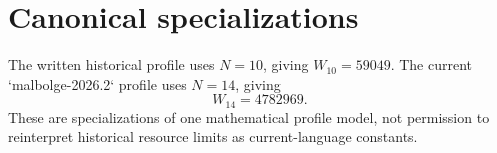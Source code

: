 \documentclass{article}
\begin{document}
\section{Canonical specializations}

The written historical profile uses $N=10$, giving $W_{10}=59049$. The current
`malbolge-2026.2` profile uses $N=14$, giving
\begin{equation}
  W_{14}=4782969.
  \label{eq:profile-current-width}
\end{equation}
These are specializations of one mathematical profile model, not permission to
reinterpret historical resource limits as current-language constants.
\end{document}
